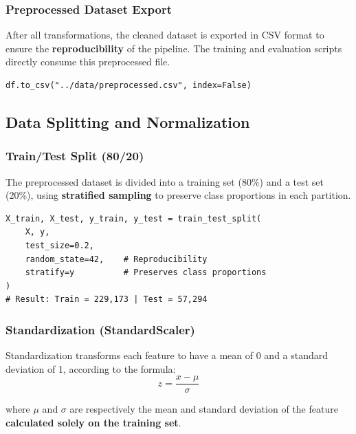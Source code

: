 \documentclass[12pt,a4paper]{article}
\begin{document}
\subsubsection{Preprocessed Dataset Export}

After all transformations, the cleaned dataset is exported in CSV format to ensure the \textbf{reproducibility} of the pipeline. The training and evaluation scripts directly consume this preprocessed file.

\begin{lstlisting}[caption={Preprocessed dataset export}]
df.to_csv("../data/preprocessed.csv", index=False)
\end{lstlisting}

\subsection{Data Splitting and Normalization}

\subsubsection{Train/Test Split (80/20)}

The preprocessed dataset is divided into a training set (80\%) and a test set (20\%), using \textbf{stratified sampling} to preserve class proportions in each partition.

\begin{lstlisting}[caption={Stratified dataset splitting}]
X_train, X_test, y_train, y_test = train_test_split(
    X, y,
    test_size=0.2,
    random_state=42,    # Reproducibility
    stratify=y          # Preserves class proportions
)
# Result: Train = 229,173 | Test = 57,294
\end{lstlisting}

\subsubsection{Standardization (StandardScaler)}
\label{sec:standardscaler}

Standardization transforms each feature to have a mean of 0 and a standard deviation of 1, according to the formula:
\begin{equation}
    z = \frac{x - \mu}{\sigma}
\end{equation}

\noindent where $\mu$ and $\sigma$ are respectively the mean and standard deviation of the feature \textbf{calculated solely on the training set}.
\end{document}
